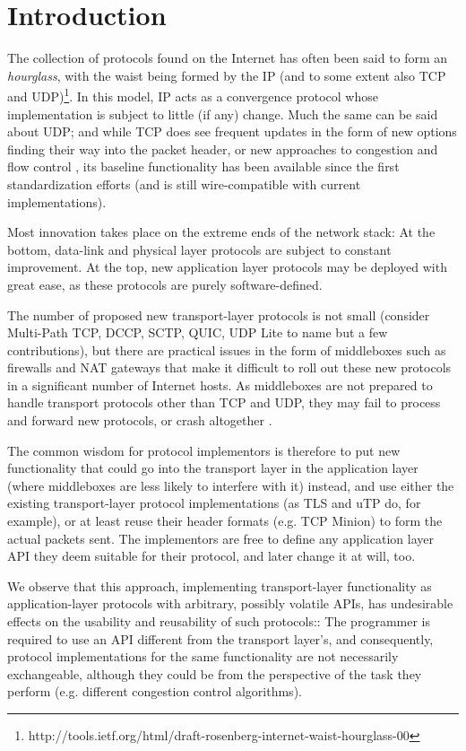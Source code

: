 \section{Introduction}

The collection of protocols found on the Internet has often been
said to form an \textit{hourglass}, with the waist being formed by
the \ac{IP} (and to some extent also \ac{TCP} and
\ac{UDP})\footnote{http://tools.ietf.org/html/draft-rosenberg-internet-waist-hourglass-00}.
In this model, \ac{IP} acts as a convergence protocol whose
implementation is subject to little (if any) change. Much the same
can be said about \ac{UDP}; and while \ac{TCP} does see frequent
updates in the form of new options finding their way into the packet
header, or new approaches to congestion and flow control
\cite{IW10,cubic,more-tcp-cong-ctrl-refs}, its baseline functionality
has been available since the first standardization efforts \cite{rfc793}
(and is still wire-compatible with current implementations).

Most innovation takes place on the extreme ends of the network
stack: At the bottom, data-link and physical layer protocols are
subject to constant improvement. At the top, new application layer
protocols may be deployed with great ease, as these protocols are
purely software-defined.

The number of proposed new transport-layer protocols is not small
(consider Multi-Path TCP, DCCP, SCTP, QUIC, UDP Lite to name but a
few contributions), but there are practical issues in the form of
middleboxes such as firewalls and \ac{NAT} gateways that make it
difficult to roll out these new protocols in a significant number
of Internet hosts. As middleboxes are not prepared to handle transport
protocols other than TCP and UDP, they may fail to process and
forward new protocols, or crash altogether \cite{ECN-survey}.

The common wisdom for protocol implementors is therefore to put new
functionality that could go into the transport layer in the application
layer (where middleboxes are less likely to interfere with it)
instead, and use either the existing transport-layer protocol
implementations (as TLS and uTP do, for example), or at least reuse
their header formats (e.g. TCP Minion) to form the actual packets
sent. The implementors are free to define any application layer
\ac{API} they deem suitable for their protocol, and later change
it at will, too.

We observe that this approach, implementing transport-layer
functionality as application-layer protocols with arbitrary, possibly
volatile \acp{API}, has undesirable effects on the usability and
reusability of such protocols:: The programmer is required to use
an \ac{API} different from the transport layer's, and consequently,
protocol implementations for the same functionality are not necessarily
exchangeable, although they could be from the perspective of the
task they perform (e.g. different congestion control algorithms).


